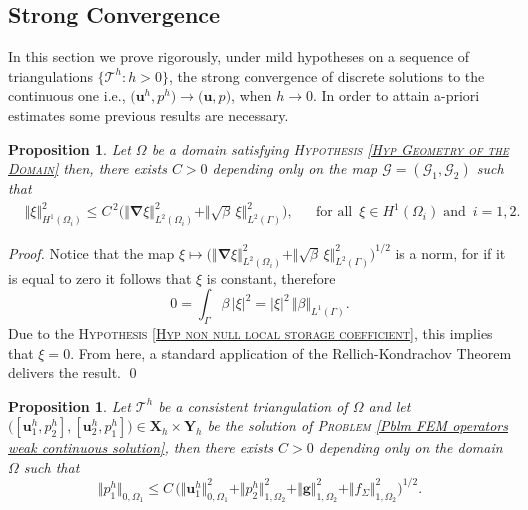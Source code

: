 \documentclass[3p]{elsarticle}
\newtheorem{proposition}[theorem]{Proposition}
\def\X{\mathbf X}
\def\Y{\mathbf Y}
\def\g{\mathbf g}
\def\u{\mathbf u}
\def\uh{\mathbf {u}^{h}}
\def\ph{p^{h}}
\def\grad{\bm{\nabla}}
\def\uoneh{\mathbf{u}_{1}^{h}}
\def\utwoh{\mathbf{u}_{2}^{h}}
\def\poneh{p_{1}^{h}}
\def\ptwoh{p_{2}^{h}}
\def\stress{f_{\Sigma } }
\def\triang{\mathcal{T}}
\def\map{\mathcal{G} }%
\def\mapone{\mathcal{G}_{1} }%
\def\maptwo{\mathcal{G}_{2}} %
\begin{document}
\subsection{Strong Convergence}
%
%
In this section we prove rigorously, under mild hypotheses on a sequence of triangulations $\{\triang^{h}: h > 0\}$, the strong convergence of discrete solutions to the continuous one i.e., $\big(\uh , \ph \big) \rightarrow \big(\u, p\big)$, when $h\rightarrow 0$. In order to attain a-priori estimates some previous results are necessary.
%
%
\begin{proposition}\label{Th L^2 Norm Control}
%
Let $\Omega$ be a domain satisfying \textsc{Hypothesis \ref{Hyp Geometry of the Domain}} then, there exists $C > 0$ depending only on the map $\map = (\mapone, \maptwo) $ such that
%
\begin{align}\label{Ineq Control With Gradient and Trace}
%  
&\Vert \xi \Vert^{2}_{H^{1}(\Omega_{i})}
\leq   C^{\,2}\Big(\Vert\grad  \xi \Vert^{2}_{L^{2}(\Omega_{i})} + 
\Vert \sqrt{\beta} \, \xi \Vert^{2}_{L^{2}(\Gamma)} 
\Big) , & %
& \text{for all }\, \xi \in H^{1}(\Omega_{i}) \; \text{and }\, i = 1,2.
%
\end{align}
%
\end{proposition}
%
\begin{proof}
%
Notice that the map $\displaystyle \xi \mapsto \Big(\Vert\grad  \xi \Vert^{2}_{L^{2}(\Omega_{i})} + 
\Vert \sqrt{\beta}  \, \xi \Vert^{2}_{L^{2}(\Gamma)} 
\Big)^{1/2}$ is a norm, for if it is equal to zero it follows that $\xi$ is constant, therefore 
%
\begin{equation*}
0 = \int_{\Gamma} \beta \, \vert \xi\vert^{2} =\vert \xi\vert^{2}\, \Vert \beta \Vert_{L^{1}(\Gamma)}.
\end{equation*} 
%
Due to the \textsc{Hypothesis \ref{Hyp non null local storage coefficient}}, this implies that $\xi = 0$. From here, a standard application of the Rellich-Kondrachov Theorem delivers the result.
\qed 
%
\end{proof}
%
%
\begin{proposition}
   Let $\triang^{h}$ be a consistent triangulation of $\Omega$ and let $\big([\uoneh, \ptwoh],[\utwoh, \poneh]\big)\in \X_{h}\times \Y_{h}$ be the solution of \textsc{Problem} \eqref{Pblm FEM operators weak continuous solution}, then there exists $C > 0$ depending only on the domain $\Omega$ such that
   \begin{equation}\label{Ineq Estimate of Pressure One}
      \Vert \poneh\Vert_{0, \Omega_{1}}%
      \leq C\, \big(\Vert \uoneh \Vert_{0, \Omega_{1}}^{2}
      + \Vert \ptwoh \Vert_{1, \Omega_{2}}^{2}
      + \Vert \g \Vert_{1, \Omega_{2}}^{2}
      + \Vert \stress \Vert_{1, \Omega_{2}}^{2}
      \big)^{1/2} .
   \end{equation}
%
\end{proposition}
\end{document}
